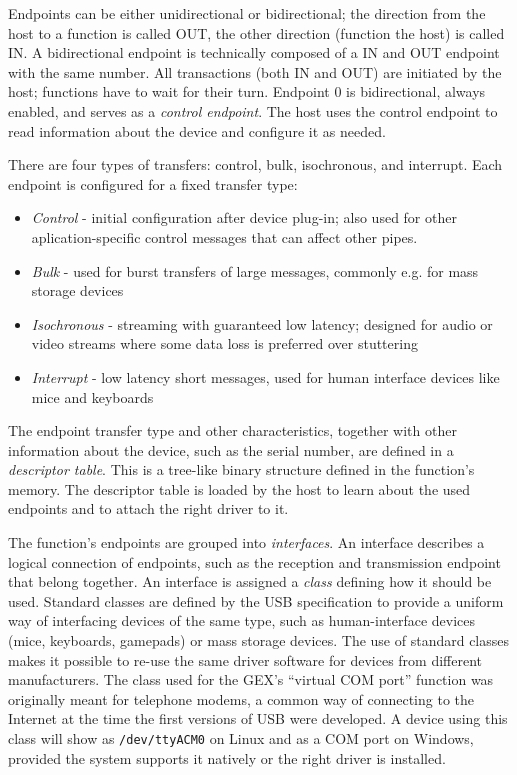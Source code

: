Endpoints can be either unidirectional or bidirectional; the direction from the host to a function is called OUT, the other direction (function the host) is called IN. A bidirectional endpoint is technically composed of a IN and OUT endpoint with the same number. All transactions (both IN and OUT) are initiated by the host; functions have to wait for their turn. Endpoint 0 is bidirectional, always enabled, and serves as a \textit{control endpoint}. The host uses the control endpoint to read information about the device and configure it as needed.

There are four types of transfers: control, bulk, isochronous, and interrupt. Each endpoint is configured for a fixed transfer type:

\begin{itemize}
	\item \textit{Control} - initial configuration after device plug-in; also used for other aplication-specific control messages that can affect other pipes.
	\item \textit{Bulk} - used for burst transfers of large messages, commonly e.g. for mass storage devices
	\item \textit{Isochronous} - streaming with guaranteed low latency; designed for audio or video streams where some data loss is preferred over stuttering
	\item \textit{Interrupt} - low latency short messages, used for human interface devices like mice and keyboards
\end{itemize}

The endpoint transfer type and other characteristics, together with other information about the device, such as the serial number, are defined in a \textit{descriptor table}. This is a tree-like binary structure defined in the function's memory. The descriptor table is loaded by the host to learn about the used endpoints and to attach the right driver to it.

The function's endpoints are grouped into \textit{interfaces}. An interface describes a logical connection of endpoints, such as the reception and transmission endpoint that belong together. An interface is assigned a \textit{class} defining how it should be used. Standard classes are defined by the USB specification to provide a uniform way of interfacing devices of the same type, such as human-interface devices (mice, keyboards, gamepads) or mass storage devices. The use of standard classes makes it possible to re-use the same driver software for devices from different manufacturers. The class used for the GEX's ``virtual COM port'' function was originally meant for telephone modems, a common way of connecting to the Internet at the time the first versions of USB were developed. A device using this class will show as \verb|/dev/ttyACM0| on Linux and as a COM port on Windows, provided the system supports it natively or the right driver is installed.


